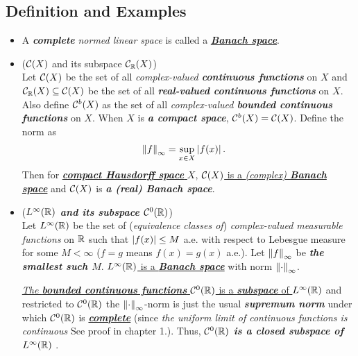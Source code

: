 \documentclass[11pt]{article}
\begin{document}
\subsection{Definition and Examples}
\begin{itemize}
\item \begin{definition}
A \emph{\textbf{complete}} \emph{normed linear space} is called a \underline{\emph{\textbf{Banach space}}}.
\end{definition}

\item \begin{example} (${\mathcal C}(X)$ and its subspace ${\mathcal C}_{{\mathbb R}}(X)$)\\
Let ${\mathcal C}(X)$ be the set of all \emph{complex-valued \textbf{continuous functions}} on $X$ and ${\mathcal C}_{{\mathbb R}}(X) \subseteq {\mathcal C}(X)$ be the set of all \emph{\textbf{real-valued continuous functions}} on $X$. Also define ${\mathcal C}^{b}(X)$ as the set of all \emph{complex-valued \textbf{bounded continuous functions}} on $X$. When $X$ is \emph{\textbf{a compact space}}, ${\mathcal C}^{b}(X) = {\mathcal C}(X)$.  Define the norm as 
\begin{align*}
\left\|f\right\|_{\infty} &= \sup_{x\in X}\left\lvert f(x) \right\rvert.
\end{align*} Then for \underline{\emph{\textbf{compact Hausdorff space}} $X$}, \underline{${\mathcal C}(X)$ is a \emph{(complex) \textbf{Banach space}}} and ${\mathcal C}(X)$ is \emph{\textbf{a (real) Banach space}}.
\end{example}


\item \begin{example} (\emph{\textbf{$L^{\infty}({\mathbb R})$ and its subspace ${\mathcal C}^{0}({\mathbb R})$}})\\
Let $L^{\infty}({\mathbb R})$ be the set of (\emph{equivalence classes of}) \emph{complex-valued measurable functions} on ${\mathbb R}$ such that $\left\lvert f(x) \right\rvert\le M$ a.e. with respect to Lebesgue measure for some $M < \infty$ ($f = g$ means $f(x) = g(x)$ a.e.). Let $\left\|f\right\|_{\infty}$ be \emph{\textbf{the smallest such $M$}}. \underline{$L^{\infty}({\mathbb R})$ is a \emph{\textbf{Banach space}}} with norm $\left\|\cdot\right\|_{\infty}$. 

\underline{\emph{The \textbf{bounded continuous functions}} ${\mathcal C}^{0}({\mathbb R})$ is a \emph{\textbf{subspace}} of $L^{\infty}({\mathbb R})$}  and restricted to ${\mathcal C}^{0}({\mathbb R})$ the $\left\|\cdot\right\|_{\infty}$-norm is just the usual \emph{\textbf{supremum norm}} under which ${\mathcal C}^{0}({\mathbb R})$  is \underline{\emph{\textbf{complete}}} (since \emph{the uniform limit of continuous functions is continuous} See proof in chapter 1.). Thus, \emph{\textbf{${\mathcal C}^{0}({\mathbb R})$ is a closed subspace of $L^{\infty}({\mathbb R})$ }}.


\end{example}
\end{itemize}
\end{document}
